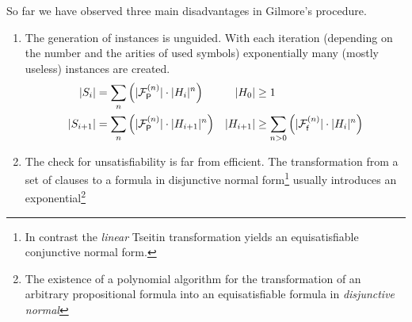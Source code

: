 \noindent So far we have observed three main disadvantages in Gilmore's procedure.
\begin{enumerate}
	\item\label{enum:gilmore:generation}
	The generation of instances is unguided.
	With each iteration 
	(depending on the number and the arities of used symbols) exponentially many (mostly useless)
	instances are created.
	\begin{align*}
	\lvert S_{i} \rvert &= \sum_n \left( \lvert {\mathcal{F}^{(n)}_{\mathsf{P}}} \rvert\cdot \lvert H_{i}\rvert^n \right)
	&
	\lvert H_0 \rvert &\geq 1
	\\
	\lvert S_{i+1} \rvert &= \sum_n \left( \lvert {\mathcal{F}^{(n)}_{\mathsf{P}}} \rvert\cdot \lvert H_{i+1}\rvert^n \right)
	&
	\lvert H_{i+1}\rvert &\geq
	\sum_{n>0}\left(
	\lvert{\mathcal{F}^{(n)}_{\mathsf{f}}}\rvert\cdot\lvert H_i \rvert^n
	\right)
	\end{align*}
	\item\label{enum:gilmore:transformation}
	The check for unsatisfiability is far from efficient.
	The transformation from a set of clauses
	to a formula in disjunctive normal form\footnote{
		In contrast the \emph{linear} Tseitin transformation yields an equisatisfiable conjunctive normal form.
	}
	usually introduces an exponential\footnote{
		The existence of a polynomial algorithm
		for the transformation of
		an arbitrary propositional formula into
		an equisatisfiable formula in \emph{disjunctive normal
}}
\end{enumerate}
